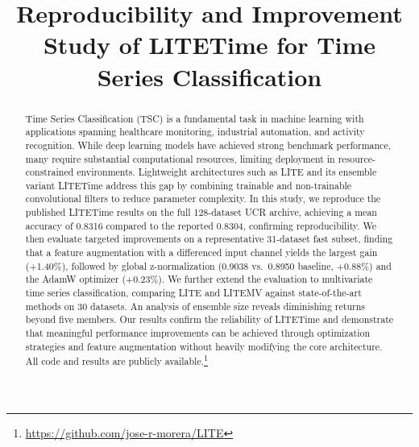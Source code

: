\documentclass[conference]{IEEEtran}
\begin{document}
\title{Reproducibility and Improvement Study of LITETime for Time Series Classification}

\author{
\and
{}
\and
{}
}

\maketitle

\begin{abstract}
Time Series Classification (TSC) is a fundamental task in machine learning with applications spanning healthcare monitoring, industrial automation, and activity recognition. While deep learning models have achieved strong benchmark performance, many require substantial computational resources, limiting deployment in resource-constrained environments. Lightweight architectures such as LITE and its ensemble variant LITETime address this gap by combining trainable and non-trainable convolutional filters to reduce parameter complexity. In this study, we reproduce the published LITETime results on the full 128-dataset UCR archive, achieving a mean accuracy of 0.8316 compared to the reported 0.8304, confirming reproducibility. We then evaluate targeted improvements on a representative 31-dataset fast subset, finding that a feature augmentation with a differenced input channel yields the largest gain (+1.40\%), followed by global z-normalization (0.9038 vs.\ 0.8950 baseline, +0.88\%) and the AdamW optimizer (+0.23\%). We further extend the evaluation to multivariate time series classification, comparing LITE and LITEMV against state-of-the-art methods on 30 datasets. An analysis of ensemble size reveals diminishing returns beyond five members. Our results confirm the reliability of LITETime and demonstrate that meaningful performance improvements can be achieved through optimization strategies and feature augmentation without heavily modifying the core architecture. All code and results are publicly available.\footnote{\url{https://github.com/jose-r-morera/LITE}}
\end{abstract}
\end{document}
